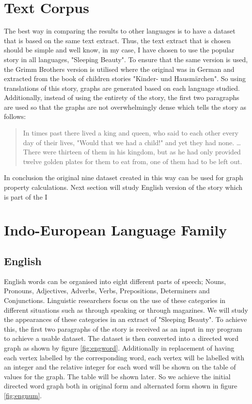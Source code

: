 \section{Text Corpus}
The best way in comparing the results to other languages is to have a dataset that is based on the same text extract. Thus, the text extract that is chosen should be simple and well know, in my case, I have chosen to use the popular story in all languages, "Sleeping Beauty". To ensure that the same version is used, the Grimm Brothers version is utilised where the original was in German and extracted from the book of children stories "Kinder- und Hausmärchen"\cite{grimm1857kinder}. So using translations of this story, graphs are generated based on each language studied.  Additionally, instead of using the entirety of the story, the first two paragraphs are used so that the graphs are not overwhelmingly dense which tells the story as follows:
\begin{quote}
In times past there lived a king and queen, who said to each other every day of their lives, "Would that we had a child!" and yet they had none. \dots There were thirteen of them in his kingdom, but as he had only provided twelve golden plates for them to eat from, one of them had to be left out.
\end{quote}
In conclusion the original nine dataset created in this way can be used for graph property calculations. Next section will study English version of the story which is part of the I

\section{Indo-European Language Family}

\subsection{English}
English words can be organised into eight different parts of speech; Nouns, Pronouns, Adjectives, Adverbs, Verbs, Prepositions, Determiners and Conjunctions. Linguistic researchers focus on the use of these categories in different situations such as through speaking or through magazines\cite{Pkhaisaeng2017study}. We will study the appearances of these categories in an extract of "Sleeping Beauty". To achieve this, the first two paragraphs of the story is received as an input in my program to achieve a usable dataset. The dataset is then converted into a directed word graph as shown by figure \ref{fig:engword}. Additionally in replacement of having each vertex labelled by the corresponding word, each vertex will be labelled with an integer and the relative integer for each word will be shown on the table of values for the graph. The table will be shown later. So we achieve the initial directed word graph both in original form and alternated form shown in figure \ref{fig:engnum}.

